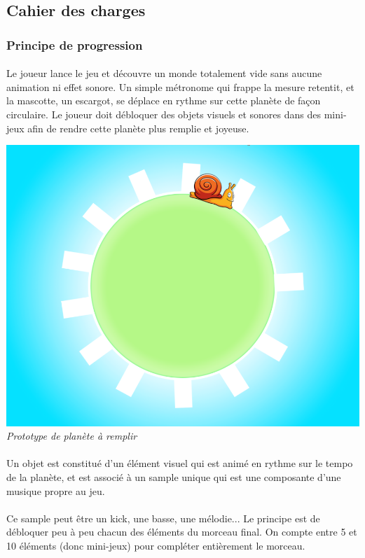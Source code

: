 \subsection{Cahier des charges}

\subsubsection{Principe de progression}
\paragraph{} Le joueur lance le jeu et découvre un monde totalement vide sans aucune animation ni effet sonore. Un simple métronome qui frappe la mesure retentit, et la mascotte, un escargot, se déplace en rythme sur cette planète de façon circulaire.
Le joueur doit débloquer des objets visuels et sonores dans des mini-jeux afin de rendre cette planète plus remplie et joyeuse.
\begin{center}
\includegraphics[scale=0.4]{img/protoPlanete.png}\\
\textit{Prototype de planète à remplir}
\end{center}
\paragraph{} Un objet est constitué d’un élément visuel qui est animé en rythme sur le tempo de la planète, et est associé à un sample unique qui est une composante d’une musique propre au jeu.\
\paragraph{}Ce sample peut être un kick, une basse, une mélodie... Le principe est de débloquer peu à peu chacun des éléments du morceau final. On compte entre 5 et 10 éléments (donc mini-jeux) pour compléter entièrement le morceau.
